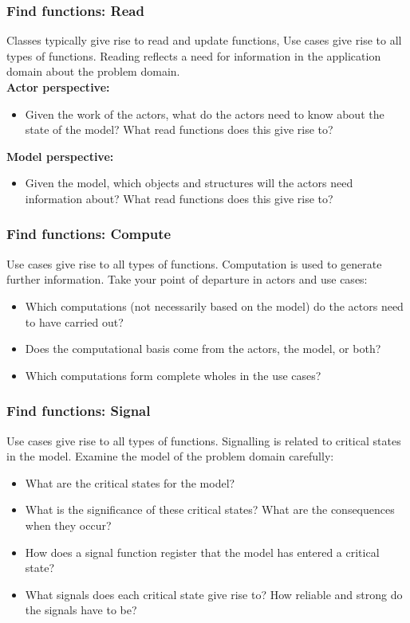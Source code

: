 \subsubsection{Find functions: Read}
Classes typically give rise to read and update functions, Use cases give rise to all types of functions. Reading reflects a need for information in the application domain about the problem domain. \\
\textbf{Actor perspective:}
\begin{itemize}
    \item Given the work of the actors, what do the actors need to know about the state of the model? What read functions does this give rise to?
\end{itemize}
\textbf{Model perspective:}
\begin{itemize}
    \item Given the model, which objects and structures will the actors need information about? What read functions does this give rise to?
\end{itemize}

\subsubsection{Find functions: Compute}
Use cases give rise to all types of functions. Computation is used to generate further information. Take your point of departure in actors and use cases:
\begin{itemize}
    \item Which computations (not necessarily based on the model) do the actors need to have carried out?
    \item Does the computational basis come from the actors, the model, or both?
    \item Which computations form complete wholes in the use cases?
\end{itemize}

\subsubsection{Find functions: Signal}
Use cases give rise to all types of functions. Signalling is related to critical states in the model. Examine the model of the problem domain carefully:
\begin{itemize}
    \item What are the critical states for the model?
    \item What is the significance of these critical states? What are the consequences when they occur?
    \item How does a signal function register that the model has entered a critical state?
    \item What signals does each critical state give rise to? How reliable and strong do the signals have to be?
\end{itemize}


